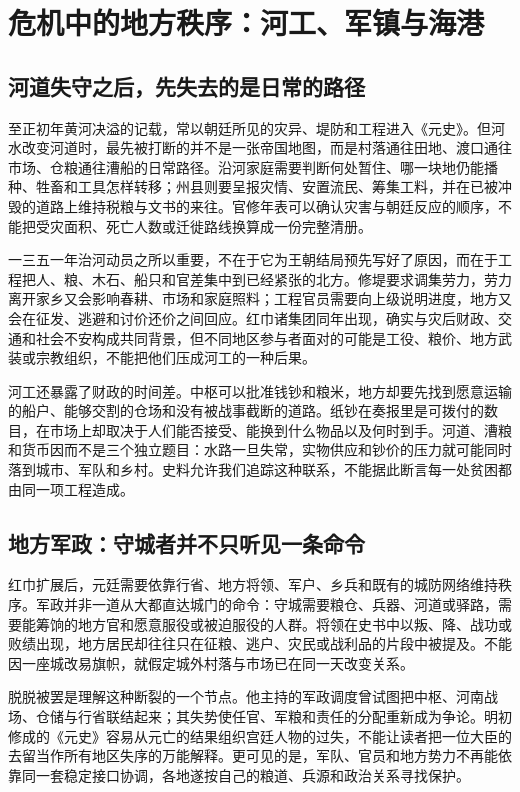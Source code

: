 \section{危机中的地方秩序：河工、军镇与海港}

\subsection{河道失守之后，先失去的是日常的路径}

至正初年黄河决溢的记载，常以朝廷所见的灾异、堤防和工程进入《元史》。但河水改变河道时，最先被打断的并不是一张帝国地图，而是村落通往田地、渡口通往市场、仓粮通往漕船的日常路径。沿河家庭需要判断何处暂住、哪一块地仍能播种、牲畜和工具怎样转移；州县则要呈报灾情、安置流民、筹集工料，并在已被冲毁的道路上维持税粮与文书的来往。官修年表可以确认灾害与朝廷反应的顺序，不能把受灾面积、死亡人数或迁徙路线换算成一份完整清册。

一三五一年治河动员之所以重要，不在于它为王朝结局预先写好了原因，而在于工程把人、粮、木石、船只和官差集中到已经紧张的北方。修堤要求调集劳力，劳力离开家乡又会影响春耕、市场和家庭照料；工程官员需要向上级说明进度，地方又会在征发、逃避和讨价还价之间回应。红巾诸集团同年出现，确实与灾后财政、交通和社会不安构成共同背景，但不同地区参与者面对的可能是工役、粮价、地方武装或宗教组织，不能把他们压成河工的一种后果。

河工还暴露了财政的时间差。中枢可以批准钱钞和粮米，地方却要先找到愿意运输的船户、能够交割的仓场和没有被战事截断的道路。纸钞在奏报里是可拨付的数目，在市场上却取决于人们能否接受、能换到什么物品以及何时到手。河道、漕粮和货币因而不是三个独立题目：水路一旦失常，实物供应和钞价的压力就可能同时落到城市、军队和乡村。史料允许我们追踪这种联系，不能据此断言每一处贫困都由同一项工程造成。

\subsection{地方军政：守城者并不只听见一条命令}

红巾扩展后，元廷需要依靠行省、地方将领、军户、乡兵和既有的城防网络维持秩序。军政并非一道从大都直达城门的命令：守城需要粮仓、兵器、河道或驿路，需要能筹饷的地方官和愿意服役或被迫服役的人群。将领在史书中以叛、降、战功或败绩出现，地方居民却往往只在征粮、逃户、灾民或战利品的片段中被提及。不能因一座城改易旗帜，就假定城外村落与市场已在同一天改变关系。

脱脱被罢是理解这种断裂的一个节点。他主持的军政调度曾试图把中枢、河南战场、仓储与行省联结起来；其失势使任官、军粮和责任的分配重新成为争论。明初修成的《元史》容易从元亡的结果组织宫廷人物的过失，不能让读者把一位大臣的去留当作所有地区失序的万能解释。更可见的是，军队、官员和地方势力不再能依靠同一套稳定接口协调，各地遂按自己的粮道、兵源和政治关系寻找保护。

